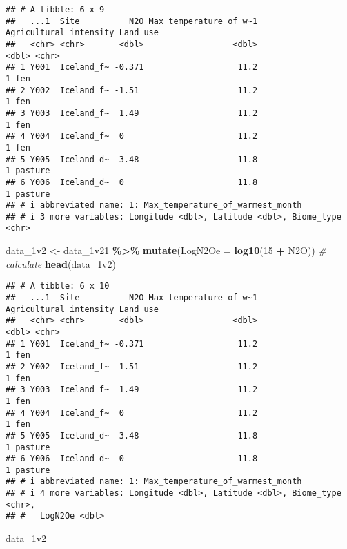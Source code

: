 \documentclass[
]{article}
\newenvironment{Shaded}{\begin{snugshade}}{\end{snugshade}}
\newcommand{\AttributeTok}[1]{\textcolor[rgb]{0.13,0.29,0.53}{#1}}
\newcommand{\CommentTok}[1]{\textcolor[rgb]{0.56,0.35,0.01}{\textit{#1}}}
\newcommand{\DecValTok}[1]{\textcolor[rgb]{0.00,0.00,0.81}{#1}}
\newcommand{\FunctionTok}[1]{\textcolor[rgb]{0.13,0.29,0.53}{\textbf{#1}}}
\newcommand{\NormalTok}[1]{#1}
\newcommand{\OtherTok}[1]{\textcolor[rgb]{0.56,0.35,0.01}{#1}}
\newcommand{\SpecialCharTok}[1]{\textcolor[rgb]{0.81,0.36,0.00}{\textbf{#1}}}
\begin{document}
\begin{verbatim}
## # A tibble: 6 x 9
##   ...1  Site          N2O Max_temperature_of_w~1 Agricultural_intensity Land_use
##   <chr> <chr>       <dbl>                  <dbl>                  <dbl> <chr>   
## 1 Y001  Iceland_f~ -0.371                   11.2                      1 fen     
## 2 Y002  Iceland_f~ -1.51                    11.2                      1 fen     
## 3 Y003  Iceland_f~  1.49                    11.2                      1 fen     
## 4 Y004  Iceland_f~  0                       11.2                      1 fen     
## 5 Y005  Iceland_d~ -3.48                    11.8                      1 pasture 
## 6 Y006  Iceland_d~  0                       11.8                      1 pasture 
## # i abbreviated name: 1: Max_temperature_of_warmest_month
## # i 3 more variables: Longitude <dbl>, Latitude <dbl>, Biome_type <chr>
\end{verbatim}

\begin{Shaded}
\begin{Highlighting}[]
\NormalTok{data\_1v2 }\OtherTok{\textless{}{-}}\NormalTok{ data\_1v21  }\SpecialCharTok{\%\textgreater{}\%}
  \FunctionTok{mutate}\NormalTok{(}\AttributeTok{LogN2Oe =} \FunctionTok{log10}\NormalTok{(}\DecValTok{15} \SpecialCharTok{+}\NormalTok{ N2O)) }\CommentTok{\# calculate}
\FunctionTok{head}\NormalTok{(data\_1v2)}
\end{Highlighting}
\end{Shaded}

\begin{verbatim}
## # A tibble: 6 x 10
##   ...1  Site          N2O Max_temperature_of_w~1 Agricultural_intensity Land_use
##   <chr> <chr>       <dbl>                  <dbl>                  <dbl> <chr>   
## 1 Y001  Iceland_f~ -0.371                   11.2                      1 fen     
## 2 Y002  Iceland_f~ -1.51                    11.2                      1 fen     
## 3 Y003  Iceland_f~  1.49                    11.2                      1 fen     
## 4 Y004  Iceland_f~  0                       11.2                      1 fen     
## 5 Y005  Iceland_d~ -3.48                    11.8                      1 pasture 
## 6 Y006  Iceland_d~  0                       11.8                      1 pasture 
## # i abbreviated name: 1: Max_temperature_of_warmest_month
## # i 4 more variables: Longitude <dbl>, Latitude <dbl>, Biome_type <chr>,
## #   LogN2Oe <dbl>
\end{verbatim}

\begin{Shaded}
\begin{Highlighting}[]
\NormalTok{data\_1v2}
\end{Highlighting}
\end{Shaded}
\end{document}
